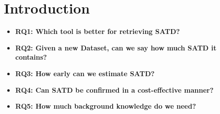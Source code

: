 \section{Introduction}
\begin{itemize}
    \item \textbf{RQ1: Which tool is better for retrieving SATD?}
    \item \textbf{RQ2: Given a new Dataset, can we say how much SATD it contains?}
    \item \textbf{RQ3: How early can we estimate SATD?}
    \item \textbf{RQ4: Can SATD be confirmed in a cost-effective manner?}
    \item \textbf{RQ5: How much background knowledge do we need?}
\end{itemize}

